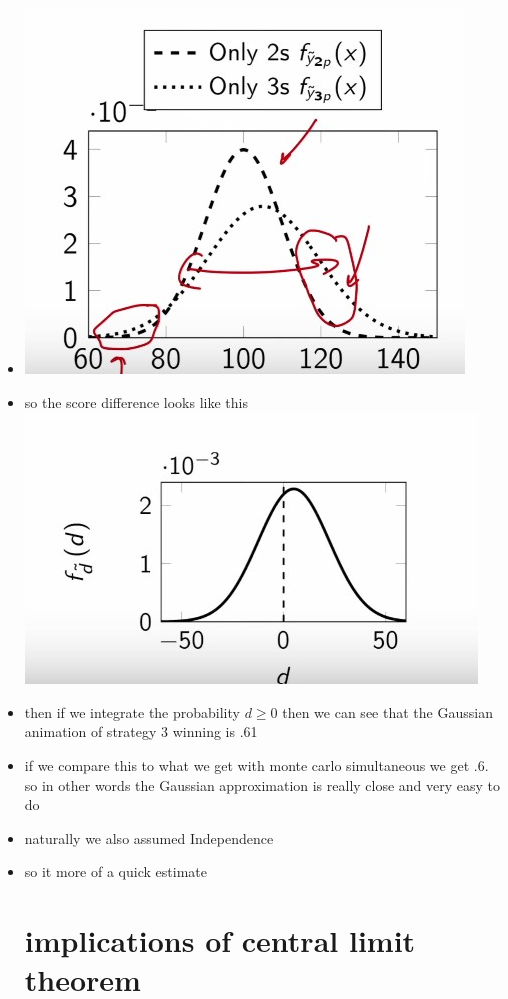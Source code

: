 \documentclass{article}
\begin{document}
\begin{itemize}
\item \includegraphics[widht=10cm]{notes/week_4/Video 2: THE CENTRAL LIMIT THEOREM/immages/v_2_2.jpg}
\item so the score difference looks like this \\\includegraphics[widht=10cm]{notes/week_4/Video 2: THE CENTRAL LIMIT THEOREM/immages/v_2_3.jpg} 
\item then if we integrate the probability $d\geq 0$ then we can see that  the Gaussian animation of strategy 3 winning is .61
\item if we compare this to what we get with monte carlo simultaneous we get .6. so in other words the Gaussian approximation is really close and very easy to do 
\item naturally we also assumed Independence
\item so it more of a quick estimate
\section{implications of central limit theorem}

\end{itemize}
\end{document}
